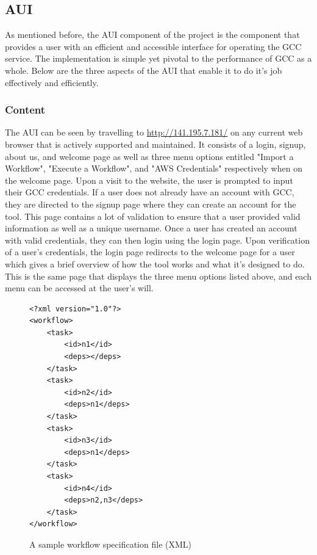 \documentclass[fleqn,10pt]{SelfArx} %
\begin{document}
\subsection{AUI}

As mentioned before, the AUI component of the project is the component that provides a user with an efficient and accessible interface for operating the GCC service. The implementation is simple yet pivotal to the performance of GCC as a whole. Below are the three aspects of the AUI that enable it to do it's job effectively and efficiently.

\subsubsection{Content}

The AUI can be seen by travelling to \href{http://141.195.7.181/}{http://141.195.7.181/} on any current web browser that is actively supported and maintained. It consists of a login, signup, about us, and welcome page as well as three menu options entitled "Import a Workflow", "Execute a Workflow", and "AWS Credentials" respectively when on the welcome page. Upon a visit to the website, the user is prompted to input their GCC credentials. If a user does not already have an account with GCC, they are directed to the signup page where they can create an account for the tool. This page contains a lot of validation to ensure that a user provided valid information as well as a unique username. Once a user has created an account with valid credentials, they can then login using the login page. Upon verification of a user’s credentials, the login page redirects to the welcome page for a user which gives a brief overview of how the tool works and what it’s designed to do. This is the same page that displays the three menu options listed above, and each menu can be accessed at the user’s will.

\begin{figure}[t!]
\centering
\begin{tcolorbox}[boxrule=0.5pt,colback=cyan!15!white]
\begin{lstlisting}[basicstyle=\footnotesize, frame=lines]
<?xml version="1.0"?>
<workflow>
    <task>
        <id>n1</id>
        <deps></deps>
    </task>
    <task>
        <id>n2</id>
        <deps>n1</deps>
    </task>
    <task>
        <id>n3</id>
        <deps>n1</deps>
    </task>
    <task>
        <id>n4</id>
        <deps>n2,n3</deps>
    </task>
</workflow>
\end{lstlisting}
\end{tcolorbox}
\caption{A sample workflow specification file (XML)}
\label{fig:xmlspec}
\end{figure}
\end{document}
